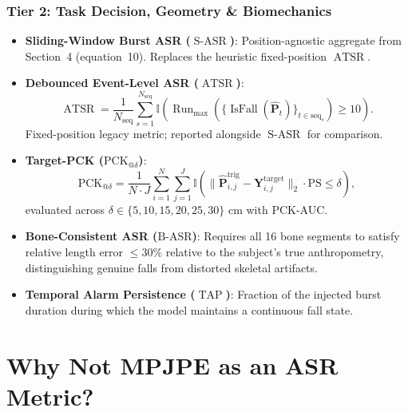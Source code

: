 \documentclass{article}
\newcommand{\IsFall}{\operatorname{IsFall}}
\newcommand{\SASR}{\operatorname{S-ASR}}
\newcommand{\ATSR}{\operatorname{ATSR}}
\newcommand{\TAP}{\operatorname{TAP}}
\begin{document}
\subsubsection{Tier 2: Task Decision, Geometry \& Biomechanics}
\begin{itemize}
    \item \textbf{Sliding-Window Burst ASR ($\SASR$)}: Position-agnostic aggregate from
          Section~4 (equation~10). Replaces the heuristic fixed-position $\ATSR$.
    \item \textbf{Debounced Event-Level ASR ($\ATSR$)}:
    \begin{equation}
      \ATSR = \frac{1}{N_{\text{seq}}} \sum_{s=1}^{N_{\text{seq}}}
        \mathbb{I}\!\left( \operatorname{Run}_{\max}\!\left(
          \{\IsFall(\hat{\mathbf{P}}_t)\}_{t \in \text{seq}_s}
        \right) \ge 10 \right).
    \end{equation}
    Fixed-position legacy metric; reported alongside $\SASR$ for comparison.
    \item \textbf{Target-PCK ($\text{PCK}_{@\delta}$)}:
    \begin{equation}
      \text{PCK}_{@\delta} = \frac{1}{N \cdot J} \sum_{i=1}^N \sum_{j=1}^J
        \mathbb{I}\!\left(
          \|\hat{\mathbf{P}}_{i,j}^{\text{trig}} - \mathbf{Y}_{i,j}^{\text{target}}\|_2
          \cdot \text{PS} \le \delta
        \right),
    \end{equation}
    evaluated across $\delta \in \{5, 10, 15, 20, 25, 30\}\text{ cm}$ with PCK-AUC.
    \item \textbf{Bone-Consistent ASR ($\text{B-ASR}$)}: Requires all 16 bone segments to
          satisfy relative length error $\le 30\%$ relative to the subject's true anthropometry,
          distinguishing genuine falls from distorted skeletal artifacts.
    \item \textbf{Temporal Alarm Persistence ($\TAP$)}: Fraction of the injected burst duration
          during which the model maintains a continuous fall state.
\end{itemize}

\section{Why Not MPJPE as an ASR Metric?}
\end{document}
